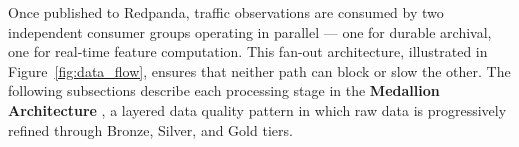   Once published to Redpanda, traffic observations are consumed by two                                                                                    
  independent consumer groups operating in parallel — one for durable
  archival, one for real-time feature computation. This fan-out architecture,                                                                             
  illustrated in Figure~\ref{fig:data_flow}, ensures that neither path                                                                                    
  can block or slow the other. The following subsections describe each                                                                                    
  processing stage in the \textbf{Medallion Architecture}                                                                                                 
  \cite{databricks_lakehouse}, a layered data quality pattern in which raw                                                                                
  data is progressively refined through Bronze, Silver, and Gold tiers.                                                                                   
                  
